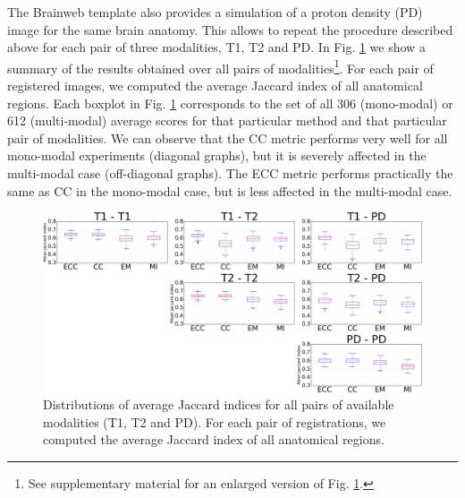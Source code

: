The Brainweb template also provides a simulation of a proton density (PD) image for the same brain anatomy. This allows to repeat the procedure described above for each pair of three modalities, T1, T2 and PD. In Fig. \ref{fig:all_pairs_boxplots} we show a summary of the results obtained over all pairs of modalities\footnote{See supplementary material for an enlarged version of Fig. \ref{fig:all_pairs_boxplots}.}. For each pair of registered images, we computed the average Jaccard index of all anatomical regions. Each boxplot in Fig. \ref{fig:all_pairs_boxplots} corresponds to the set of all 306 (mono-modal) or 612 (multi-modal) average scores for that particular method and that particular pair of modalities. We can observe that the CC metric performs very well for all mono-modal experiments (diagonal graphs), but it is severely affected in the multi-modal case (off-diagonal graphs). The ECC metric performs practically the same as CC in the mono-modal case, but is less affected in the multi-modal case.
%
%



\begin{figure}[t!]
\centering
    \includegraphics[width=\linewidth]{./images/all_modality_pairs_boxplots.png}
    \caption{{\small Distributions of average Jaccard indices for all pairs of available modalities (T1, T2 and PD). For each pair of registrations, we computed the average Jaccard index of all anatomical regions.}}
\label{fig:all_pairs_boxplots}\figcloser
\end{figure}

